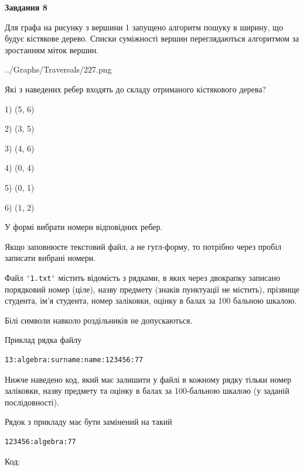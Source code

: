 \documentclass[12pt, ukrainian]{article}
\def\code#1{\Verb!#1!}
\begin{document}
{\begin {large}
{\begin {center}\textbf{Завдання 8}\end {center}}\par
Для графа на рисунку з вершини 1 запущено алгоритм пошуку в ширину, що будує кістякове дерево. Списки суміжності вершин переглядаються алгоритмом за зростанням міток вершин.\par
\begin{center}
	{../Graphs/Traversals/227.png}
\end{center}
\par Які з наведених ребер входять до складу отриманого кістякового дерева?\par
1) (5, 6)\par
2) (3, 5)\par
3) (4, 6)\par
4) (0, 4)\par
5) (0, 1)\par
6) (1, 2)\par
{\vskip 15pt} У формі вибрати номери відповідних ребер.


Якщо заповнюєте текстовий файл, а не гугл-форму, то потрібно через пробіл записа\-ти вибрані номери.\par
\newpage


Файл \code{'1.txt'} містить відомість з рядками, в яких через двокрапку записа\-но поряд\-ковий номер (ціле), назву предмету (знаків пунктуації не містить), прізвище студента, ім'я студента, номер заліковки, оцінку в балах за 100 бальною шкалою.

Білі символи навколо роздільників не допускаються.

Приклад рядка файлу



\begin{verbatim}
13:algebra:surname:name:123456:77
\end{verbatim}


Нижче наведено код, який має залишити у файлі в кожному рядку тільки номер заліковки, назву предмету та оцінку в балах за 100-бальною шкалою (у заданій послі\-дов\-ності).

Рядок з прикладу має бути замінений на такий



\begin{verbatim}
123456:algebra:77
\end{verbatim}




Код:




\end{large}}
\end{document}
